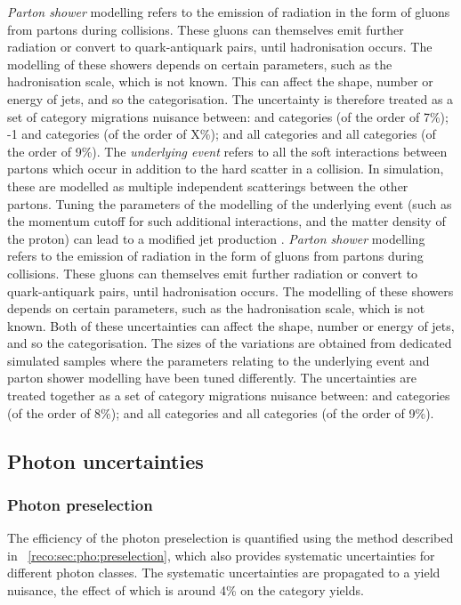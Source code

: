 \emph{Parton shower} modelling refers to the emission of \QCD radiation in the form of gluons from partons during \pp collisions. These gluons can themselves emit further \QCD radiation or convert to quark-antiquark pairs, until hadronisation occurs. The modelling of these showers depends on certain parameters, such as the hadronisation scale, which is not known. This can affect the shape, number or energy of jets, and so the \VBF categorisation. The uncertainty is therefore treated as a set of category migrations nuisance between:  and  categories (of the order of 7\%); -1  and  categories (of the order of X\%); and all \VBFTag categories and all \Untagged categories (of the order of 9\%).
\else
The \emph{underlying event} refers to all the soft interactions between partons which occur in addition to the hard scatter in a \pp collision. In simulation, these are modelled as multiple independent scatterings between the other partons. Tuning the parameters of the modelling of the underlying event (such as the momentum cutoff for such additional interactions, and the matter density of the proton) can lead to a modified jet production \crosssection. %
\emph{Parton shower} modelling refers to the emission of \QCD radiation in the form of gluons from partons during \pp collisions. These gluons can themselves emit further \QCD radiation or convert to quark-antiquark pairs, until hadronisation occurs. The modelling of these showers depends on certain parameters, such as the hadronisation scale, which is not known. 
Both of these uncertainties can affect the shape, number or energy of jets, and so the \VBF categorisation. The sizes of the variations are obtained from dedicated simulated samples where the parameters relating to the underlying event and parton shower modelling have been tuned differently. The uncertainties are treated together as a set of category migrations nuisance between:  and  categories (of the order of 8\%); and all \VBFTag categories and all \Untagged categories (of the order of 9\%).
\fi
\subsection{Photon uncertainties}

\subsubsection{Photon preselection}
The efficiency of the photon preselection is quantified using the \TagAndProbe method described in \Sec~\ref{reco:sec:pho:preselection}, which also provides systematic uncertainties for different photon classes. The systematic uncertainties are propagated to a yield nuisance, the effect of which is around 4\% on the category yields.

